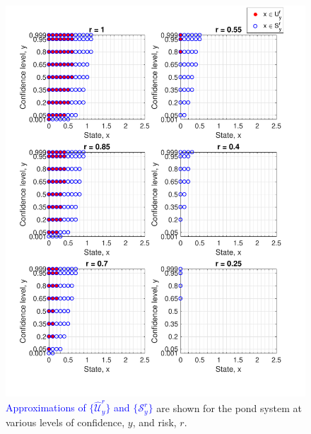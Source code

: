 \documentclass[letterpaper, 10 pt, conference]{ieeeconf}  %
\begin{document}
\begin{figure}[thpb]
      \centering
      \includegraphics[scale=0.5]{output_CompareScript_Sept112018.pdf}
      \caption{ \textcolor{blue}{Approximations of $\{\widehat{\mathcal{U}}_y^r\}$ and $\{\mathcal{S}_y^r\}$} are shown for the pond system at various levels of confidence, $y$, and risk, $r$. } 
      \label{compare}
\end{figure}
\end{document}
